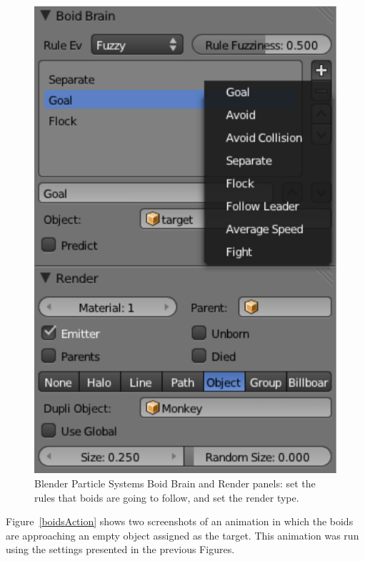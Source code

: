 \begin{figure}[htbp]
\begin{center}
\includegraphics[scale = 0.65]{figures/boidsBrain.pdf}
\caption{Blender Particle Systems Boid Brain and Render panels: set the rules that boids are going to follow, and set the render type.}
\label{boidsBrain}
\end{center}
\end{figure}

Figure~\ref{boidsAction} shows two screenshots of an animation in which the boids are approaching an empty object assigned as the target. This animation was run using the settings presented in the previous Figures.

